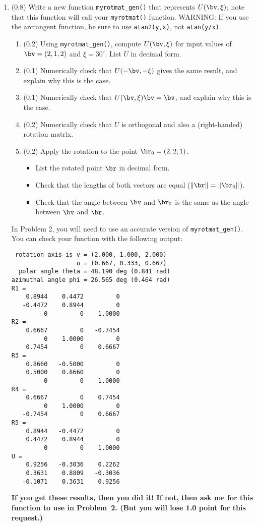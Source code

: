 \documentclass[11pt,titlepage,fleqn]{article}
\newcommand{\rotangB}{\xi}    %
\newcommand{\rotvec}{\bv}      %
\newcommand{\Umat}{U}
\begin{document}
\begin{enumerate}
\item (0.8) Write a new function \verb+myrotmat_gen()+ that represents $\Umat(\rotvec,\rotangB)$; note that this function will call your \verb+myrotmat()+ function. WARNING: If you use the arctangent function, be sure to use \verb+atan2(y,x)+, not \verb+atan(y/x)+.
%
\begin{enumerate}
\item (0.2) Using \verb+myrotmat_gen()+, compute $\Umat(\rotvec,\rotangB)$ for input values of $\rotvec = (2,1,2)$ and $\rotangB = 30^\circ$. List $\Umat$ in decimal form.
\item (0.1) Numerically check that $\Umat(-\rotvec,-\rotangB)$ gives the same result, and explain why this is the case.
\item (0.1) Numerically check that $\Umat(\rotvec,\rotangB)\rotvec = \rotvec$, and explain why this is the case.
\item (0.2) Numerically check that $\Umat$ is orthogonal and also a (right-handed) rotation matrix.
\item (0.2) Apply the rotation to the point $\br_0 = (2,2,1)$.
%
\begin{itemize}
\item List the rotated point $\br$ in decimal form.
\item Check that the lengths of both vectors are equal ($\|\br\| = \|\br_0\|$).
\item Check that the angle between $\rotvec$ and $\br_0$ is the same as the angle between  $\rotvec$ and $\br$.
\end{itemize}
\end{enumerate}
%
In Problem 2, you will need to use an accurate version of \verb+myrotmat_gen()+. You can check your function with the following output:
%
\begin{spacing}{1.0}
\begin{verbatim}
 rotation axis is v = (2.000, 1.000, 2.000)
                  u = (0.667, 0.333, 0.667)
  polar angle theta = 48.190 deg (0.841 rad)
azimuthal angle phi = 26.565 deg (0.464 rad)
R1 =
    0.8944    0.4472         0
   -0.4472    0.8944         0
         0         0    1.0000
R2 =
    0.6667         0   -0.7454
         0    1.0000         0
    0.7454         0    0.6667
R3 =
    0.8660   -0.5000         0
    0.5000    0.8660         0
         0         0    1.0000
R4 =
    0.6667         0    0.7454
         0    1.0000         0
   -0.7454         0    0.6667
R5 =
    0.8944   -0.4472         0
    0.4472    0.8944         0
         0         0    1.0000
U =
    0.9256   -0.3036    0.2262
    0.3631    0.8809   -0.3036
   -0.1071    0.3631    0.9256
\end{verbatim}
\end{spacing}
%
{\bf If you get these results, then you did it! If not, then ask me for this function to use in Problem~2. (But you will lose 1.0 point for this request.)}


\end{enumerate}
\end{document}

